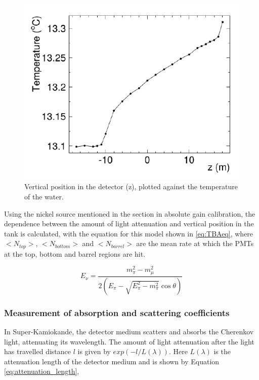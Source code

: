 \begin{figure}
    \includegraphics[width=\textwidth]{Figures/watergrad.png}
\caption{Vertical position in the detector (z), plotted against the temperature of the water.}
    \label{fig:watergrad}
\end{figure}

Using the nickel source mentioned in the section in absolute gain calibration, the dependence between the amount of light attenuation and vertical position in the tank is calculated, with the equation for this model shown in \ref{eq:TBAeq}, where $<N_{top}>$, $<N_{bottom}>$ and $<N_{barrel}>$ are the mean rate at which the PMTs at the top, bottom and barrel regions are hit.  

\begin{equation}
    E_{\nu}=\frac{m_{\pi}^{2}-m_{\mu}^{2}}{2\left(E_{\pi}-\sqrt{E_{\pi}^{2}-m_{\pi}^{2}} \cos \theta\right)}
\label{eq:TBAeq}
\end{equation}

\subsubsection{Measurement of absorption and scattering coefficients}

In Super-Kamiokande, the detector medium scatters and absorbs the Cherenkov light, attenuating its wavelength. The amount of light attenuation after the light has travelled distance $l$ is given by $exp(-l/L(\lambda))$. Here $L(\lambda)$ is the attenuation length of the detector medium and is shown by Equation \ref{eq:attenuation_length}, 

